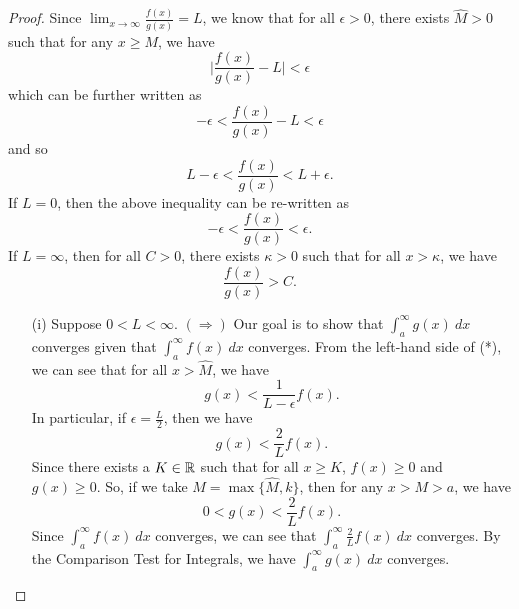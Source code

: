 \documentclass[a4paper]{article}
\begin{document}
\begin{proof}
    Since \( \lim_{ x \to \infty  } \frac{ f(x) }{ g(x) } = L  \), we know that for all \( \epsilon > 0  \), there exists \( \hat{M} > 0  \) such that for any \( x \geq  M  \), we have
    \[  \Big| \frac{ f(x) }{ g(x) }  - L  \Big|  < \epsilon \]
    which can be further written as 
    \[  - \epsilon < \frac{ f(x) }{ g(x) }  - L < \epsilon \]
    and so 
    \[  L - \epsilon  < \frac{ f(x) }{ g(x) }  < L + \epsilon. \tag{*} \]
    If \( L  = 0  \), then the above inequality can be re-written as 
    \[  - \epsilon < \frac{ f(x) }{  g(x) } < \epsilon. \tag{**} \]
    If \( L = \infty   \), then for all \( C > 0  \), there exists \( \kappa > 0  \) such that for all \( x > \kappa  \), we have 
    \[  \frac{ f(x) }{ g(x) }  > C. \tag{***}  \]
    \begin{enumerate}
        \item[(i)] Suppose \(  0  < L < \infty  \). \( (\Longrightarrow) \) Our goal is to show that \( \int_{ a }^{ \infty  } g(x) \ dx   \) converges given that \( \int_{ a }^{ \infty  } f(x) \ dx  \) converges. From the left-hand side of (*), we can see that for all \( x > \hat{M} \), we have 
           \[  g(x) < \frac{ 1  }{ L - \epsilon } f(x). \] 
           In particular, if \( \epsilon = \frac{ L }{ 2 }  \), then we have
           \[  g(x) < \frac{ 2 }{ L } f(x). \]
           Since there exists a \(  K \in \mathbb{R}  \) such that for all \( x \geq K  \), \( f(x) \geq 0  \) and \( g(x) \geq 0  \). So, if we take \( M  = \max \{ \hat{M}, k  \}  \), then for any \( x > M > a   \), we have 
           \[  0 < g(x) <  \frac{ 2 }{ L } f(x). \]
           Since \( \int_{ a }^{ \infty  } f(x) \ dx  \) converges, we can see that \( \int_{ a }^{ \infty  }  \frac{ 2 }{ L }  f(x) \ dx  \) converges. By the Comparison Test for Integrals, we have \( \int_{ a }^{ \infty  } g(x) \ dx  \) converges.


\end{enumerate}
\end{proof}
\end{document}
